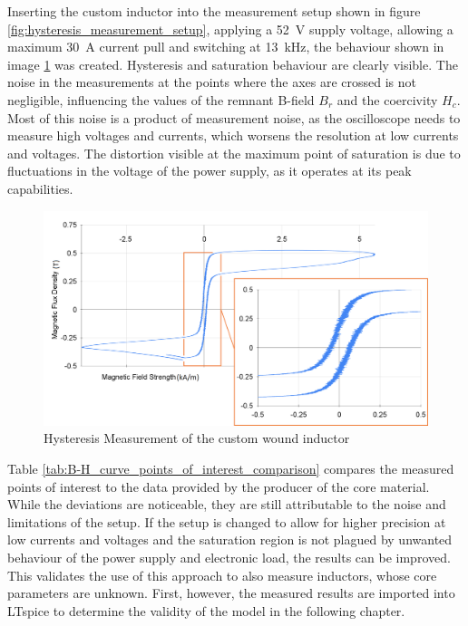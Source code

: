 Inserting the custom inductor into the measurement setup shown in figure \ref{fig:hysteresis_measurement_setup}, applying a \SI{52}{\V} supply voltage, allowing a maximum \SI{30}{\A} current pull and switching at \SI{13}{\kilo\Hz}, the behaviour shown in image \ref{fig:hysteresis_measurement_of_the_custom_wound_inductor} was created. 
Hysteresis and saturation behaviour are clearly visible. The noise in the measurements at the points where the axes are crossed is not negligible, influencing the values of the remnant B-field $B_r$ and the coercivity $H_c$. Most of this noise is a product of measurement noise, as the oscilloscope needs to measure high voltages and currents, which worsens the resolution at low currents and voltages. The distortion visible at the maximum point of saturation is due to fluctuations in the voltage of the power supply, as it operates at its peak capabilities.
\begin{figure}[H]
    \centering
    \includegraphics[width=1\linewidth]{Bilder//Kapitel3/Hysteresis_Measurement_3.png}
    \caption{Hysteresis Measurement of the custom wound inductor}
    \label{fig:hysteresis_measurement_of_the_custom_wound_inductor}
\end{figure}
Table \ref{tab:B-H_curve_points_of_interest_comparison} compares the measured points of interest to the data provided by the producer of the core material. While the deviations are noticeable, they are still attributable to the noise and limitations of the setup. If the setup is changed to allow for higher precision at low currents and voltages and the saturation region is not plagued by unwanted behaviour of the power supply and electronic load, the results can be improved. This validates the use of this approach to also measure inductors, whose core parameters are unknown. First, however, the measured results are imported into LTspice to determine the validity of the model in the following chapter.
